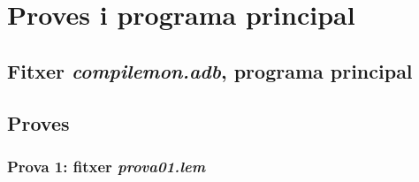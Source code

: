 \section{Proves i programa principal}

\subsection{Fitxer \emph{compilemon.adb}, programa principal}

\newpage

\subsection{Proves}
\subsubsection{Prova 1: fitxer \emph{prova01.lem}}

\newpage
